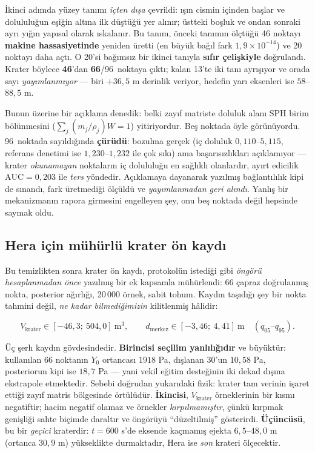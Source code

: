 \documentclass[12pt,a4paper]{article}
\newcommand{\havuzToplam}{96}
\begin{document}
İkinci adımda yüzey tanımı \emph{içten dışa} çevrildi: ışın cismin
içinden başlar ve dolululuğun eşiğin altına ilk düştüğü yer alınır;
üstteki boşluk ve ondan sonraki ayrı yığın yapısal olarak ıskalanır.
Bu tanım, önceki tanımın ölçtüğü 46 noktayı \textbf{makine
hassasiyetinde} yeniden üretti (en büyük bağıl fark $1{,}9\times
10^{-14}$) ve 20 noktayı daha açtı. O 20'si bağımsız bir ikinci tanıyla
\textbf{sıfır çelişkiyle} doğrulandı. Krater böylece
\textbf{46}'dan \textbf{66}/\havuzToplam\ noktaya çıktı; kalan 13'te
iki tanı ayrışıyor ve orada sayı \emph{yayımlanmıyor} --- biri
$+36{,}5$ m derinlik veriyor, hedefin yarı eksenleri ise
$58$--$88{,}5$ m.

Bunun üzerine bir açıklama denedik: belki zayıf matriste doluluk alanı
SPH birim bölünmesini ($\sum_j (m_j/\rho_j)W = 1$) yitiriyordur.
Beş noktada öyle görünüyordu. \havuzToplam\ noktada sayıldığında
\textbf{çürüdü}: bozulma gerçek (iç doluluk $0{,}110$--$5{,}115$,
referans denetimi ise $1{,}230$--$1{,}232$ ile çok sıkı) ama
başarısızlıkları açıklamıyor --- krater \emph{okunamayan} noktaların
iç dolululuğu en sağlıklı olanlardır, ayırt edicilik
$\mathrm{AUC}=0{,}203$ ile \emph{ters} yöndedir. Açıklamaya dayanarak
yazılmış bağlantılılık kipi de sınandı, fark üretmediği ölçüldü ve
\emph{yayımlanmadan geri alındı}. Yanlış bir mekanizmanın rapora
girmesini engelleyen şey, onu beş noktada değil hepsinde saymak oldu.

\subsection{Hera için mühürlü krater ön kaydı}

Bu temizlikten sonra krater ön kaydı, protokolün istediği gibi
\emph{öngörü hesaplanmadan önce} yazılmış bir ek kapsamla mühürlendi:
66 çapraz doğrulanmış nokta, posterior ağırlığı, 20\,000 örnek, sabit
tohum. Kaydın taşıdığı şey bir nokta tahmini değil, \emph{ne kadar
bilmediğimizin} kilitlenmiş hâlidir:

\begin{equation}
V_{\text{krater}} \in [-46{,}3;\ 504{,}0]\ \text{m}^3, \qquad
d_{\text{merkez}} \in [-3{,}46;\ 4{,}41]\ \text{m}
\quad (q_{05}\text{--}q_{95}).
\label{esit:krateronkayit}
\end{equation}

Üç şerh kaydın gövdesindedir. \textbf{Birincisi seçilim
yanlılığıdır} ve büyüktür: kullanılan 66 noktanın $Y_0$ ortancası
$1918$ Pa, dışlanan 30'un $10{,}58$ Pa, posteriorun kipi ise
$18{,}7$ Pa --- yani vekil eğitim desteğinin iki dekad dışına
ekstrapole etmektedir. Sebebi doğrudan yukarıdaki fizik: krater tam
verinin işaret ettiği zayıf matris bölgesinde örtülüdür.
\textbf{İkincisi}, $V_{\text{krater}}$ örneklerinin bir kısmı
negatiftir; hacim negatif olamaz ve örnekler \emph{kırpılmamıştır},
çünkü kırpmak genişliği sahte biçimde daraltır ve öngörüyü
``düzeltilmiş'' gösterirdi. \textbf{Üçüncüsü}, bu bir \emph{geçici}
kraterdir: $t=600$ s'de eksende kaçmamış ejekta $6{,}5$--$48{,}0$ m
(ortanca $30{,}9$ m) yükseklikte durmaktadır, Hera ise \emph{son}
krateri ölçecektir.
\end{document}
